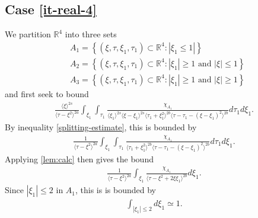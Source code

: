 \documentclass[12pt,reqno]{amsart}
\numberwithin{equation}{section}  %
\newcommand{\rr}{\mathbb{R}}
\begin{document}
\subsection{Case \eqref{it-real-4}} 
\label{ssec:case-it-real-4}
We partition $\rr^{4}$ into three sets 
%
%
\begin{equation*}
\begin{split}
  & A_{1} = \left\{ (\xi, \tau, \xi_{1}, \tau_{1}) \subset \rr^{4}: |
  \xi_{1} \le 1 | \right \} \\
  & A_{2} = \left\{ (\xi, \tau, \xi_{1}, \tau_{1}) \subset \rr^{4}:|
  \xi_{1} | \ge 1 \text{ and } | \xi| \le 1 \right \}
  \\
  & A_{3} = \left\{ (\xi, \tau, \xi_{1}, \tau_{1}) \subset \rr^{4}:|
  \xi_{1} | \ge 1 \text{ and } | \xi| \ge 1 \right \}
  \end{split}
\end{equation*}
%
%
and first seek to bound
%
%
\begin{equation}
  \label{case-2-region-1}
  \begin{split}
    \frac{ \langle \xi
    \rangle ^{2s}}{\langle \tau - \xi^{2} \rangle ^{2a}}
    \int_{\xi_{1}} \int_{\tau_{1}} \frac{\chi_{A_{1}}}{ \langle \xi_{1} \rangle ^{2s} \langle \xi-\xi_{1} \rangle ^{2s} 
    \langle \tau_{1} + \xi_{1}^{2} \rangle^{2b} \langle  \tau - \tau_{1} -
    (\xi - \xi_{1})^{2} \rangle^{2b} }
    d \tau_1 d \xi_{1}.
  \end{split}
\end{equation}
By inequality \eqref{splitting-estimate}, this is bounded by
%
%
\begin{equation*}
\begin{split}
  \frac{1}{\langle \tau - \xi^{2} \rangle ^{2a}} \int_{\xi_{1}}
  \int_{\tau_{1}}
  \frac{\chi_{A_{1}}}{\langle \tau_{1} + \xi_{1}^{2} \rangle^{2b}  \langle \tau
  - \tau_{1} - ( \xi - \xi_{1})^{2}\rangle^{2b} } d \tau_{1} d \xi_{1}.
\end{split}
\end{equation*}
%
%
Applying \cref{lem:calc} then gives the bound
%
%
\begin{equation}
\begin{split}
  \frac{1}{\langle \tau - \xi^{2} \rangle ^{2a}} \int_{\xi_{1}}
  \frac{\chi_{A_{1}}}{\langle \tau - \xi^{2} + 2 \xi \xi_{1} \rangle^{2b} } d
  \xi_{1}.
\end{split}
\label{region-1-case-2-pre-est}
\end{equation}
%
%
Since $| \xi_{1} | \le 2$ in $A_{1}$, this is is bounded by
%
%
\begin{equation*}
\begin{split}
  \int_{| \xi_{1} | \le 2} d \xi_{1} \simeq 1.
\end{split}
\end{equation*}
\end{document}
